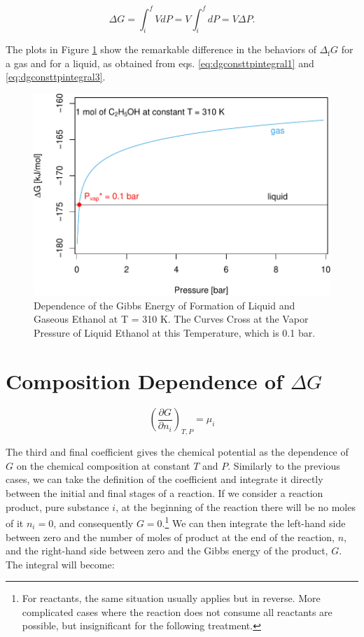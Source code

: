 \documentclass[
  9pt,
]{extbook}
\theoremstyle{definition}
\theoremstyle{definition}
\theoremstyle{definition}
\theoremstyle{definition}
\theoremstyle{remark}
\begin{document}
\begin{equation}
\Delta G = \int_i^f VdP = V \int_i^f dP = V \Delta P.
\label{eq:dgconsttpintegral3}
\end{equation}

The plots in Figure \ref{fig:gdeppfig} show the remarkable difference in the behaviors of \(\Delta_{\text{f}} G\) for a gas and for a liquid, as obtained from eqs. \eqref{eq:dgconsttpintegral1} and \eqref{eq:dgconsttpintegral3}.

\begin{figure}

{\centering \includegraphics{pchem1_files/figure-latex/gdeppfig-1} 

}

\caption{Dependence of the Gibbs Energy of Formation of Liquid and Gaseous Ethanol at T = 310 K. The Curves Cross at the Vapor Pressure of Liquid Ethanol at this Temperature, which is 0.1 bar.}\label{fig:gdeppfig}
\end{figure}

\section{\texorpdfstring{Composition Dependence of \(\Delta G\)}{Composition Dependence of \textbackslash Delta G}}\label{composition-dependence-of-delta-g}

\[
\left(\frac{\partial G}{\partial n_i} \right)_{T,P}=\mu_i
\]

The third and final coefficient gives the chemical potential as the dependence of \(G\) on the chemical composition at constant \(T\) and \(P\). Similarly to the previous cases, we can take the definition of the coefficient and integrate it directly between the initial and final stages of a reaction. If we consider a reaction product, pure substance \(i\), at the beginning of the reaction there will be no moles of it \(n_i=0\), and consequently \(G=0\).\footnote{For reactants, the same situation usually applies but in reverse. More complicated cases where the reaction does not consume all reactants are possible, but insignificant for the following treatment.} We can then integrate the left-hand side between zero and the number of moles of product at the end of the reaction, \(n\), and the right-hand side between zero and the Gibbs energy of the product, \(G\). The integral will become:
\end{document}
